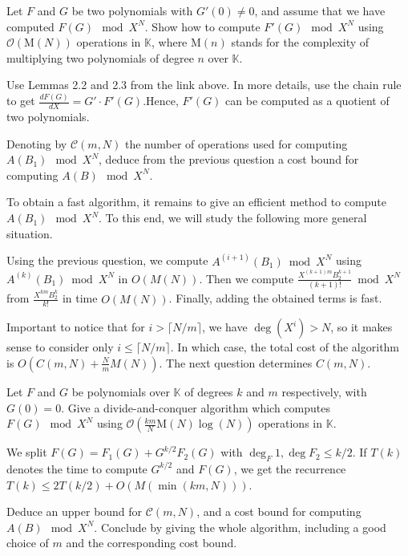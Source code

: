 \documentclass[11pt]{exam}
\theoremstyle{definition}
\newcommand{\field}{\mathbb{K}}
\begin{document}
\begin{questions}
	\question
	Let $F$ and $G$ be two polynomials with $G'(0) \neq 0$, and assume 
	that we have computed $F(G) \mod X^N$.
	Show how to compute $F'(G) \mod X^N$ using $\mathcal{O}(\mathrm{M}(N))$
	operations in $\field$, where $\mathrm{M}(n)$ stands for the complexity of multiplying 
	two polynomials of degree $n$ over $\field$.
	\begin{solution}
		Use Lemmas 2.2 and 2.3 from the link above.
		In more details, use the chain rule to get $\frac{dF(G)}{dX} = G' \cdot F'(G)$.Hence, $F'(G)$ can be computed as a quotient of two polynomials.
	\end{solution}
	\question
	Denoting by $\mathcal{C}(m,N)$ the number of operations
	used for computing $A(B_1)\mod X^N$, deduce from the
	previous question a cost bound for computing $A(B) \mod X^N$.
	
	
	To obtain a fast algorithm, it remains to give an efficient
	method to compute $A(B_1) \mod X^N$. To this end, we will
	study the following more general situation.
		\begin{solution}
			Using the previous question, we compute $A^{(i+1)}(B_1) \bmod X^N$ using $A^{(k)}(B_1) \bmod X^N$ in $O(M(N))$. Then we compute $\frac{X^{(k+1)m} B_2^{k+1}}{(k+1)!} \bmod X^N$ from $\frac{X^{km}B_2^k}{k!}$ in time $O(M(N))$. Finally, adding the obtained terms is fast. 
			
			Important to notice that for $i > \lceil N/m \rceil$, we have $\deg (X^i) >N$, so it makes sense to consider only $i \leq \lceil N/m \rceil$. In which case, the total cost of the algorithm is $O \left( C(m,N)+\frac{N}{m}M(N) \right)$. The next question determines $C(m,N)$.
		\end{solution}
	\question
	Let $F$ and $G$ be polynomials over $\field$ of degrees $k$ 
	and $m$ respectively, with $G(0) = 0$.
	Give a divide-and-conquer algorithm which computes $F(G) \mod X^N$
	using $\mathcal{O}(\frac{km}{N} \mathrm{M}(N)\log(N))$ operations in $\field$.
	\begin{solution}
		We split $F(G) = F_1(G)+G^{k/2}F_2(G)$ with $\deg_F1, \deg F_2 \leq k/2$. If $T(k) $ denotes the time to compute $G^{k/2}$ and $F(G)$, we get the recurrence $T(k) \leq 2 T(k/2)+O(M(\min(km, N)))$.
	
	\end{solution}
	\question
	Deduce an upper bound for $\mathcal{C}(m,N)$,
	and a cost bound for computing $A(B) \mod X^N$.
	Conclude by giving the whole algorithm,
	including a good choice of $m$ and the corresponding
	cost bound.
\end{questions}
\end{document}
